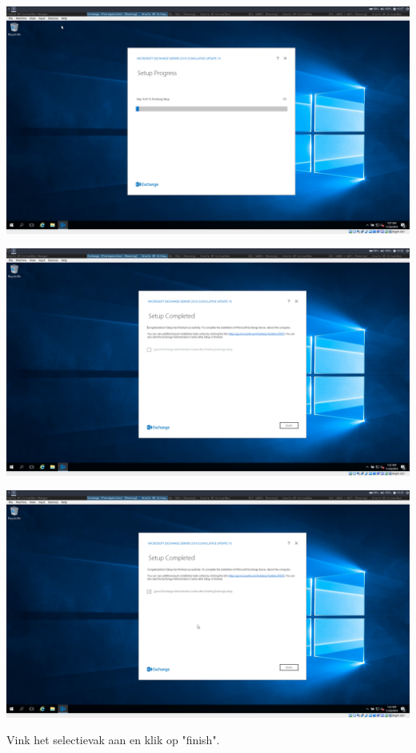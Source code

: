 \documentclass[a4paper]{article}
\begin{document}
\begin{center}
	\includegraphics[width=15cm]{Pictures/Exchange/install/1542726465.png}
	
	
\end{center}
\begin{center}
	\includegraphics[width=15cm]{Pictures/Exchange/install/1542727944.png}
	

\end{center}
\begin{center}
	\includegraphics[width=15cm]{Pictures/Exchange/install/1542728003.png}
	
		Vink het selectievak aan en klik op "finish".
\end{center}
\end{document}
